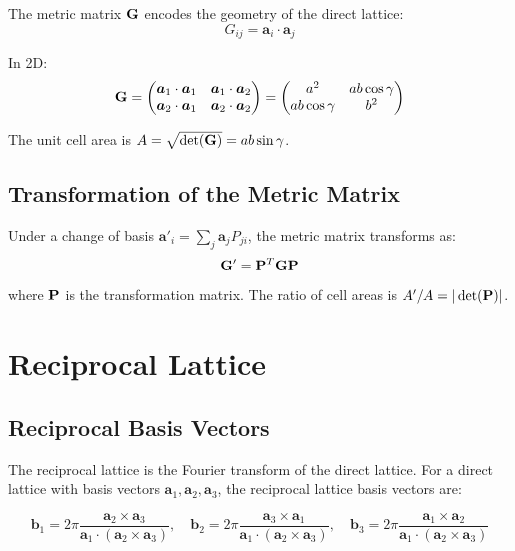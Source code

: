 The metric matrix $\mathbf{G}$ encodes the geometry of the direct lattice:
\begin{equation}
    G_{ij} = \boldsymbol{a}_i \cdot \boldsymbol{a}_j
\end{equation}

In 2D:
\begin{equation}
    \mathbf{G} = \begin{pmatrix}
    \boldsymbol{a}_1 \cdot \boldsymbol{a}_1 & \boldsymbol{a}_1 \cdot \boldsymbol{a}_2 \\
    \boldsymbol{a}_2 \cdot \boldsymbol{a}_1 & \boldsymbol{a}_2 \cdot \boldsymbol{a}_2
    \end{pmatrix} = \begin{pmatrix}
    a^2 & ab\cos\gamma \\
    ab\cos\gamma & b^2
    \end{pmatrix}
\end{equation}

The unit cell area is $A = \sqrt{\det(\mathbf{G})} = ab\sin\gamma$.

\subsection{Transformation of the Metric Matrix}

Under a change of basis $\boldsymbol{a}'_i = \sum_j \boldsymbol{a}_j P_{ji}$, the metric matrix transforms as:
\begin{equation}
    \mathbf{G}' = \mathbf{P}^T \mathbf{G} \mathbf{P}
\end{equation}
where $\mathbf{P}$ is the transformation matrix. The ratio of cell areas is $A'/A = |\det(\mathbf{P})|$.

\section{Reciprocal Lattice}

\subsection{Reciprocal Basis Vectors}

The reciprocal lattice is the Fourier transform of the direct lattice. For a direct lattice with basis vectors $\boldsymbol{a}_1, \boldsymbol{a}_2, \boldsymbol{a}_3$, the reciprocal lattice basis vectors are:

\begin{equation}
    \boldsymbol{b}_1 = 2\pi \frac{\boldsymbol{a}_2 \times \boldsymbol{a}_3}{\boldsymbol{a}_1 \cdot (\boldsymbol{a}_2 \times \boldsymbol{a}_3)}, \quad
    \boldsymbol{b}_2 = 2\pi \frac{\boldsymbol{a}_3 \times \boldsymbol{a}_1}{\boldsymbol{a}_1 \cdot (\boldsymbol{a}_2 \times \boldsymbol{a}_3)}, \quad
    \boldsymbol{b}_3 = 2\pi \frac{\boldsymbol{a}_1 \times \boldsymbol{a}_2}{\boldsymbol{a}_1 \cdot (\boldsymbol{a}_2 \times \boldsymbol{a}_3)}
\end{equation}

